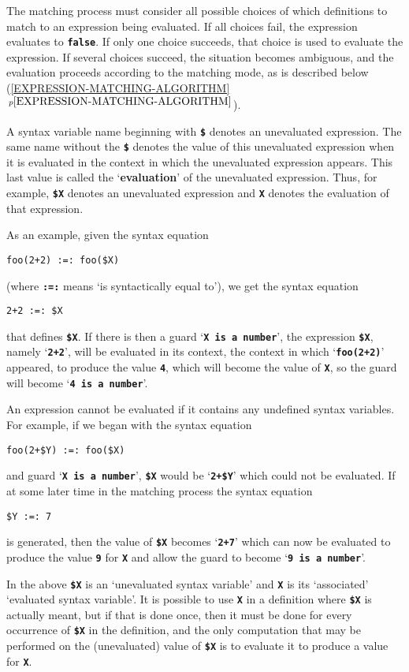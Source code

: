 \documentclass[12pt]{article}
\newcommand{\TT}[1]{{\tt \bfseries #1}}
\newcommand{\key}[1]{{\rm \bfseries #1}}
\newcommand{\ttkey}[1]{{\tt \bfseries #1}}
\newcommand{\itemref}[1]{\ref{#1}$\,^{p\pageref{#1}}$}
\begin{document}
The matching process must consider all possible choices of which definitions
to match to an expression being evaluated.  If all choices fail, the
expression evaluates to \TT{false}.  If only one choice succeeds, that
choice is used to evaluate the expression.  If several choices succeed,
the situation becomes ambiguous, and the evaluation proceeds according
to the matching mode, as is described below
(\itemref{EXPRESSION-MATCHING-ALGORITHM}).

A syntax variable name beginning with
\ttkey{\$} denotes an unevaluated
expression.  The same name without the \TT{\$} denotes the value
of this unevaluated expression when it is evaluated
in the context in which the unevaluated expression appears.
This last value is called the `\key{evaluation}' of the unevaluated
expression.  Thus, for example, \TT{\$X} denotes an unevaluated
expression and \TT{X} denotes the evaluation of that expression.

As an example, given the syntax equation
\begin{center}
\verb|foo(2+2) :=: foo($X)|
\end{center}
(where \TT{:=:} means `is syntactically equal to'), we get
the syntax equation
\begin{center}
\verb|2+2 :=: $X|
\end{center}
that defines \TT{\$X}.  If there is then a guard `\TT{X is a number}',
the expression \TT{\$X}, namely `\TT{2+2}',
will be evaluated in its context, the context in which `\TT{foo(2+2)}'
appeared, to produce the value \TT{4}, which will become the value of
\TT{X}, so the guard will become `\TT{4 is a number}'.

An expression cannot be evaluated if it contains any undefined syntax
variables.  For example, if we began with the syntax equation
\begin{center}
\verb|foo(2+$Y) :=: foo($X)|
\end{center}
and guard `\TT{X is a number}', \TT{\$X} would be `\TT{2+\$Y}' which
could not be evaluated.  If at some later time in the matching process
the syntax equation
\begin{center}
\verb|$Y :=: 7|
\end{center}
is generated, then the value of \TT{\$X} becomes `\TT{2+7}'
which can now be evaluated to produce the value \TT{9} for \TT{X}
and allow the guard to become `\TT{9 is a number}'.

In the above \TT{\$X} is an `unevaluated syntax variable' and
\TT{X} is its `associated' `evaluated syntax variable'.  It is
possible to use \TT{X} in a definition where \TT{\$X} is actually
meant, but if that is done once, then it must be done for every occurrence
of \TT{\$X} in the definition, and the only computation that may be
performed on the (unevaluated) value of \TT{\$X} is to evaluate it to
produce a value for \TT{X}.
\end{document}
